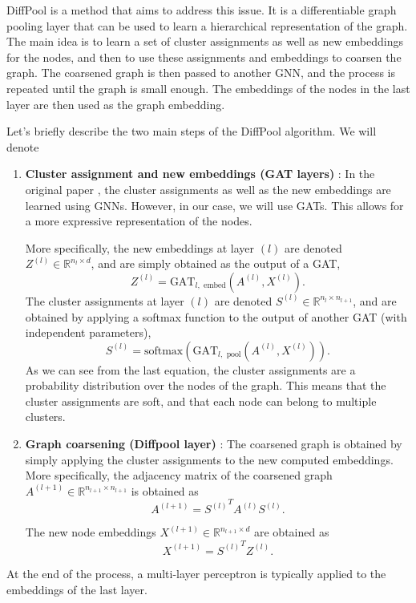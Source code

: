 \documentclass[switch, 12pt]{article}
\newcommand{\R}{\mathbb{R}}
\begin{document}
\begin{multicols}{2}
    DiffPool \cite{ying-2018} is a method that aims to address this issue. It is a differentiable graph pooling layer that can be used to learn a hierarchical representation of the graph. The main idea is to learn a set of cluster assignments as well as new embeddings for the nodes, and then to use these assignments and embeddings to coarsen the graph. The coarsened graph is then passed to another GNN, and the process is repeated until the graph is small enough. The embeddings of the nodes in the last layer are then used as the graph embedding.

    Let's briefly describe the two main steps of the DiffPool algorithm. We will denote
    \begin{enumerate}
        \item \textbf{Cluster assignment and new embeddings (GAT layers)} : In the original paper \cite{ying-2018}, the cluster assignments as well as the new embeddings are learned using GNNs. However, in our case, we will use GATs. This allows for a more expressive representation of the nodes.

              More specifically, the new embeddings at layer $(l)$ are denoted $Z^{(l)}\in\R^{n_l\times d}$, and are simply obtained as the output of a GAT,
              $$Z^{(l)} = \text{GAT}_{l, \text{ embed}}\left(A^{(l)},X^{(l)}\right).$$
              \noindent The cluster assignments at layer $(l)$ are denoted $S^{(l)}\in\R^{n_l\times n_{l+1}}$, and are obtained by applying a softmax function to the output of another GAT (with independent parameters),
              $$S^{(l)} = \text{softmax}\left(\text{GAT}_{l, \text{ pool}}\left(A^{(l)},X^{(l)}\right)\right).$$
              \noindent As we can see from the last equation, the cluster assignments are a probability distribution over the nodes of the graph. This means that the cluster assignments are soft, and that each node can belong to multiple clusters.
        \item \textbf{Graph coarsening (Diffpool layer)} : The coarsened graph is obtained by simply applying the cluster assignments to the new computed embeddings. More specifically, the adjacency matrix of the coarsened graph $A^{(l+1)} \in \R^{n_{l+1}\times n_{l+1}}$ is obtained as
              $$A^{(l+1)} = {S^{(l)}}^TA^{(l)}S^{(l)}.$$

              The new node embeddings $X^{(l+1)}\in\R^{n_{l+1}\times d}$ are obtained as
              $$X^{(l+1)} = {S^{(l)}}^T Z^{(l)}.$$
    \end{enumerate}
    At the end of the process, a multi-layer perceptron is typically applied to the embeddings of the last layer.


\end{multicols}
\end{document}

